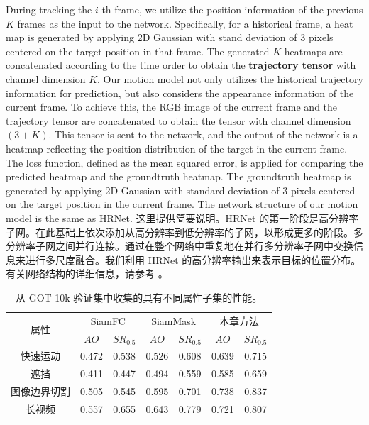 During tracking the $i$-th frame, we utilize the position information of the previous $K$ frames as the input to the network.
Specifically, for a historical frame, a heat map is generated by applying 2D Gaussian with stand deviation of 3 pixels centered on the target position in that frame.
The generated $K$ heatmaps are concatenated according to the time order to obtain the \textbf{trajectory tensor} with channel dimension $K$.
Our motion model not only utilizes the historical trajectory information for prediction, but also considers the appearance information of the current frame.
To achieve this, the RGB image of the current frame and the trajectory tensor are concatenated to obtain the tensor with channel dimension $(3+K)$. This tensor is sent to the network, and the output of the network is a heatmap reflecting the position distribution of the target in the current frame. The loss function, defined as the mean squared error, is applied for comparing the predicted heatmap and the groundtruth heatmap. The groundtruth heatmap is generated by applying 2D Gaussian with standard deviation of 3 pixels centered on the target position in the current frame. The network structure of our motion model is the same as HRNet. 
\fi
这里提供简要说明。HRNet 的第一阶段是高分辨率子网。在此基础上依次添加从高分辨率到低分辨率的子网，以形成更多的阶段。多分辨率子网之间并行连接。通过在整个网络中重复地在并行多分辨率子网中交换信息来进行多尺度融合。我们利用 HRNet 的高分辨率输出来表示目标的位置分布。有关网络结构的详细信息，请参考 \cite{sun2019deep}。

\begin{table}[t]
\centering
\caption{从 GOT-10k 验证集中收集的具有不同属性子集的性能。}
\begin{tabular}{|c|c|c|c|c|c|c|}
\hline
\multirow{2}{*}{属性} &
\multicolumn{2}{c|}{SiamFC} & \multicolumn{2}{c|}{SiamMask} &\multicolumn{2}{c|}{本章方法} \\
\cline{2-7} & $AO$ & $SR_{0.5}$ & $AO$ & $SR_{0.5}$ & $AO$ & $SR_{0.5}$ \\
\hline
快速运动 & 0.472 & 0.538 & 0.526 & 0.608 & 0.639 & 0.715 \\
\hline
遮挡 & 0.411 & 0.447 & 0.494 & 0.559 & 0.585 & 0.659 \\
\hline
图像边界切割 & 0.505 & 0.545 & 0.595 & 0.701 & 0.738 & 0.837 \\
\hline
长视频 & 0.557 & 0.655 & 0.643 & 0.779 & 0.721 & 0.807 \\
\hline
\end{tabular}
\label{table:attribute}
\end{table}

